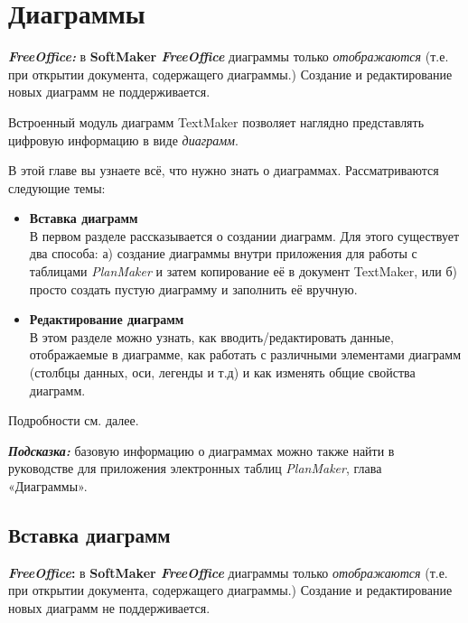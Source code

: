 ﻿\documentclass[a4paper,10pt]{article}
\begin{document}
  \section{Диаграммы} \label{sec:диаграммы}
 \begin{mdframed}[backgroundcolor=pink!50]
\textbf{\textit{FreeOffice:}} в \textbf{SoftMaker \textit{FreeOffice}} диаграммы только \textit{отображаются} (т.е. при открытии документа, содержащего диаграммы.) Создание и редактирование новых диаграмм не поддерживается.
\end{mdframed}

Встроенный модуль диаграмм TextMaker позволяет наглядно представлять цифровую информацию в виде \textit{диаграмм}.

В этой главе вы узнаете всё, что нужно знать о диаграммах. Рассматриваются следующие темы:

\begin{itemize}
 \item \textbf{Вставка диаграмм}\\
 В первом разделе рассказывается о создании диаграмм. Для этого существует два способа: а) создание диаграммы внутри приложения для работы с таблицами \textit{PlanMaker} и затем копирование её в документ TextMaker, или б) просто создать пустую диаграмму и заполнить её вручную.
 \item \textbf{Редактирование диаграмм}\\
 В этом разделе можно узнать, как вводить/редактировать данные, отображаемые в диаграмме, как работать с различными элементами диаграмм (столбцы данных, оси, легенды и т.д) и как изменять общие свойства диаграмм.
\end{itemize}

Подробности см. далее.

\begin{mdframed}[backgroundcolor=blue!10]
\textbf{\textit{Подсказка:}} базовую информацию о диаграммах можно также найти в руководстве для приложения электронных таблиц \textit{PlanMaker}, глава «Диаграммы».
\end{mdframed}

 \subsection{Вставка диаграмм}
 \begin{mdframed}[backgroundcolor=pink!50]
\textbf{\textit{FreeOffice}:} в \textbf{SoftMaker \textit{FreeOffice}} диаграммы только \textit{отображаются} (т.е. при открытии документа, содержащего диаграммы.) Создание и редактирование новых диаграмм не поддерживается.
\end{mdframed}
\end{document}
